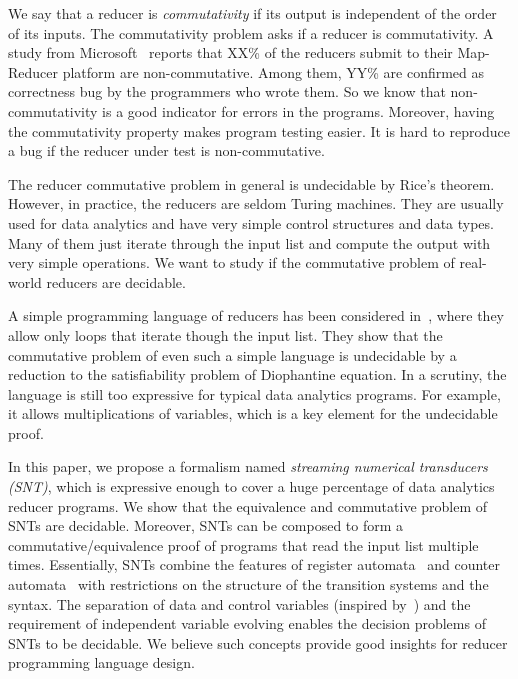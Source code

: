 \documentclass[runningheads,a4paper]{llncs}
\newcommand{\hide}[1]{}
\begin{document}
We say that a reducer is \emph{commutativity} if its output is independent of the order of its inputs. The commutativity problem asks if a reducer is commutativity. A study from Microsoft~\cite{XZZ+14} reports that XX\% of the reducers submit to their Map-Reducer platform are non-commutative. Among them, YY\% are confirmed as correctness bug by the programmers who wrote them. So we know that non-commutativity is a good indicator for errors in the programs. 
Moreover, having the commutativity property makes program testing easier. It is hard to reproduce a bug if the reducer under test is non-commutative. 

The reducer commutative problem in general is undecidable by Rice's theorem. However, in practice, the reducers  are seldom Turing machines. They are usually used for data analytics and have very simple control structures and data types. Many of them just iterate through the input list and compute the output with very simple operations.
We want to study if the commutative problem of real-world reducers are decidable.

A simple programming language of reducers has been considered in~\cite{CHSW15}, where they allow only loops that iterate though the input list\hide{(c.f. Figure~\ref{language})}. They show that the commutative problem of even such a simple language is undecidable by a reduction to the satisfiability problem of Diophantine equation. In a scrutiny, the language is still too expressive for typical data analytics programs. For example, it allows multiplications of variables, which is a key element for the undecidable proof. 

In this paper, we propose a formalism named \emph{streaming numerical transducers (SNT)}, which is expressive enough to cover a huge percentage of data analytics reducer programs. We show that the equivalence and commutative problem of SNTs are decidable. Moreover, SNTs can be composed to form a commutative/equivalence proof of programs that read the input list multiple times.
Essentially, SNTs combine the features of register automata~\cite{XX} and counter automata~\cite{XX} with restrictions on the structure of the transition systems and the syntax.
The separation of data and control variables (inspired by~\cite{RP11}) and the requirement of independent variable evolving enables the decision problems of SNTs to be decidable. 
We believe such concepts provide good insights for reducer programming language design.
\end{document}

